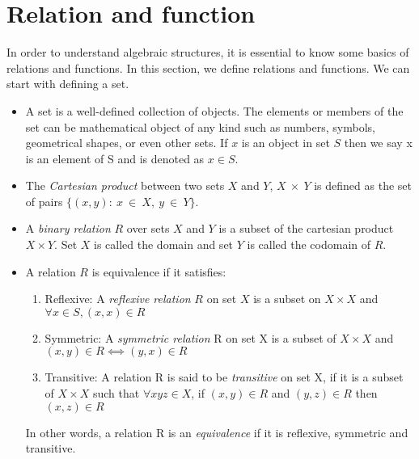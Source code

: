 \section{Relation and function}
In order to understand algebraic structures, it is essential to know some basics
of relations and functions. In this section, we define relations and functions.
We can start with defining a set.
\begin{itemize}
\item A set is a well-defined collection of objects. The elements or members of the
set can be mathematical object of any kind such as numbers, symbols, geometrical
shapes, or even other sets. If $x$ is an object in set $S$ then we say x is an
element of S and is denoted as $x \in S$.

\item The \emph{Cartesian product} between two sets $X$ and $Y$,  $X \ \times\
Y$ is defined as the set of pairs \(\{(x,y) :\ x \ \in\ X,\ y\ \in\ Y \}\). 

\item A \emph{binary relation}  $R$ over sets $X$ and $Y$ is a subset of the
cartesian product $X \times Y$. Set $X$ is called the domain and set $Y$ is
called the codomain of $R$.

\item A relation $R$ is equivalence if it satisfies:
\begin{enumerate}
    \item Reflexive: A \emph{reflexive relation} $R$ on set $X$ is a subset on
\(X \times X\) and $\forall x \in S, (x,x) \in R$

    \item Symmetric: A \emph{symmetric relation} R on set X is a subset of \(X
\times X\) and \((x,y) \in R ⟺ (y,x) \in R \)

    \item Transitive: A relation R is said to be \emph{transitive} on set X, if
it is a subset of \(X \times X\) such that \(∀ x y z \in X \), if \((x,y) \in
R\) and \((y,z) \in R \) then \((x,z) \in R\)
\end{enumerate}
In other words, a relation R is an \emph{equivalence} if it is reflexive, symmetric and transitive.


\end{itemize}
